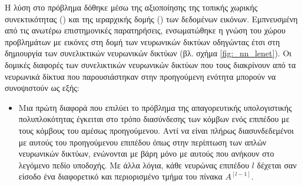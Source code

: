 Η λύση στο πρόβλημα δόθηκε μέσω της αξιοποίησης της τοπικής χωρικής συνεκτικότητας () και της ιεραρχικής δομής () των δεδομένων εικόνων. Εμπνευσμένη από τις ανωτέρω επιστημονικές παρατηρήσεις, ενσωματώθηκε η γνώση του χώρου προβλημάτων με εικόνες στη δομή των νευρωνικών δικτύων οδηγώντας έτσι στη δημιουργία των συνελικτικών νευρωνικών δικτύων (βλ. σχήμα \ref{fig:_nn_lenet}). Οι δομικές διαφορές των συνελικτικών νευρωνικών δικτύων που τους διακρίνουν από τα νευρωνικά δίκτυα που παρουσιάστηκαν στην προηγούμενη ενότητα μπορούν να συνοψιστούν ως εξής:
\begin{itemize}
  \item Μια πρώτη διαφορά που επιλύει το πρόβλημα της απαγορευτικής υπολογιστικής πολυπλοκότητας έγκειται στο τρόπο διασύνδεσης των κόμβων ενός επιπέδου με τους κόμβους του αμέσως προηγούμενου. Αντί να είναι πλήρως διασυνδεδεμένοι με αυτούς του προηγούμενου επιπέδου όπως στην περίπτωση των απλών νευρωνικών δικτύων, ενώνονται με βάρη μόνο με αυτούς που ανήκουν στο λεγόμενο πεδίο υποδοχής. Με άλλα λόγια, κάθε νευρώνας επιπέδου $l$ δέχεται σαν είσοδο ένα διαφορετικό και περιορισμένο τμήμα του πίνακα $A^{[l-1]}$.
 

\end{itemize}

